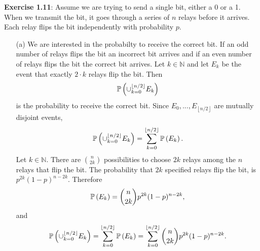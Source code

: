 \textbf{Exercise 1.11}: Assume we are trying to send a single bit, either a 0
 or a 1. When we transmit the bit, it goes through a series of $n$ relays
 before it arrives. Each relay flips the bit independently with probability $p$.
 \begin{enumerate}
   \item[(a)] We are interested in the probabilty to receive the correct bit.
    If an odd number of relays flips the bit an incorrect bit arrives and if
    an even number of relays flips the bit the correct bit arrives. Let $k \in
    \mathbb{N}$ and let $E_k$ be the event that exactly $2 \cdot k$ relays flip
    the bit. Then
    \[ \mathbb{P}\left(\cup_{k=0}^{\left\lfloor n/2 \right\rfloor} E_k \right) \]
    is the probability to receive the correct bit.
    Since $E_0,...,E_{\left\lfloor n/2 \right\rfloor}$ are mutually
    disjoint events,
    \[
      \mathbb{P}\left(\cup_{k=0}^{\left\lfloor n/2 \right\rfloor} E_k \right)
      = \sum_{k=0}^{\left\lfloor n/2 \right\rfloor} \mathbb{P}\left( E_k \right).
    \]
    Let $k \in \mathbb{N}$. There are $\binom{n}{2k}$ possibilities to choose $2k$
    relays among the $n$ relays that flip the bit. The probability that $2k$
    specified relays flip the bit, is $p^{2k}(1-p)^{n-2k}$. Therefore
    \[ \mathbb{P}\left(E_k\right) = \binom{n}{2k} p^{2k}(1-p)^{n-2k}, \]
    and
    \[
      \mathbb{P}\left(\cup_{k=0}^{\left\lfloor n/2 \right\rfloor} E_k \right)
      = \sum_{k=0}^{\left\lfloor n/2 \right\rfloor} \mathbb{P}\left( E_k \right)
      = \sum_{k=0}^{\left\lfloor n/2 \right\rfloor} \binom{n}{2k} p^{2k}(1-p)^{n-2k}.
    \]


\end{enumerate}

